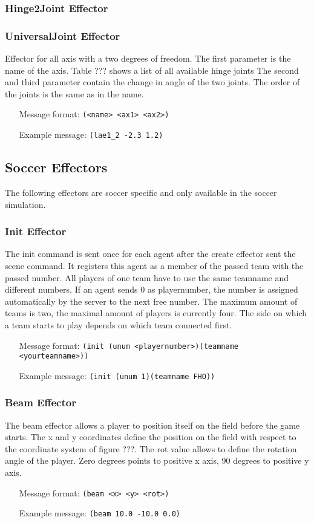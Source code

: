 \subsubsection{Hinge2Joint Effector}

\subsubsection{UniversalJoint Effector}
Effector for all axis with a two degrees of freedom.
The first parameter is the name of the axis. Table ??? shows a list of all
available hinge joints
The second and third parameter contain the change in angle of the two joints.
The order of the joints is the same as in the name.
\begin{itemize}
	\item[Message format:] \texttt{(<name> <ax1> <ax2>)}
	\item[Example message:] \texttt{(lae1\_2 -2.3 1.2)}
\end{itemize}

\subsection{Soccer Effectors}
The following effectors are soccer specific and only available in the soccer
simulation.

\subsubsection{Init Effector}
The init command is sent once for each agent after the create effector sent the
scene command. It registers this agent as a member of the passed team with the passed number.
All players of one team have to use the same teamname and different numbers.
If an agent sends 0 as playernumber, the number is assigned automatically by
the server to the next free number. The maximum amount of teams is two, the
maximal amount of players is currently four.
The side on which a team starts to play depends on which team connected
first.
\begin{itemize}
	\item[Message format:] \texttt{(init (unum <playernumber>)(teamname
	<yourteamname>))}
	\item[Example message:] \texttt{(init (unum 1)(teamname FHO))}
\end{itemize}

\subsubsection{Beam Effector}
The beam effector allows a player to position itself on the field before the
game starts. The x and y coordinates define the position on the field with
respect to the coordinate system of figure ???. The rot value allows to define
the rotation angle of the player. Zero degrees points to positive x axis, 90
degrees to positive y axis.
\begin{itemize}
	\item[Message format:] \texttt{(beam <x> <y> <rot>)}
	\item[Example message:] \texttt{(beam 10.0 -10.0 0.0)}
\end{itemize}

